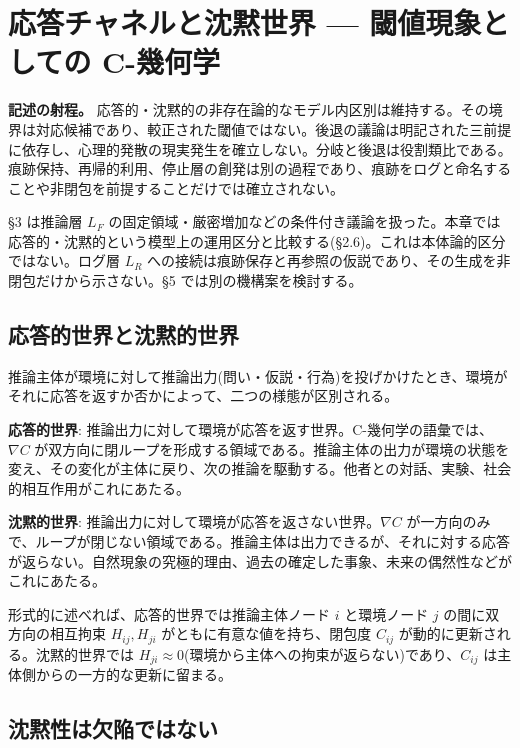 \section{応答チャネルと沈黙世界 — 閾値現象としての C-幾何学}

\noindent\textbf{記述の射程。} 応答的・沈黙的の非存在論的なモデル内区別は維持する。その境界は対応候補であり、較正された閾値ではない。後退の議論は明記された三前提に依存し、心理的発散の現実発生を確立しない。分岐と後退は役割類比である。痕跡保持、再帰的利用、停止層の創発は別の過程であり、痕跡をログと命名することや非閉包を前提することだけでは確立されない。



\S{}3 は推論層 $L_F$ の固定領域・厳密増加などの条件付き議論を扱った。本章では応答的・沈黙的という模型上の運用区分と比較する(\S{}2.6)。これは本体論的区分ではない。ログ層 $L_R$ への接続は痕跡保存と再参照の仮説であり、その生成を非閉包だけから示さない。\S{}5 では別の機構案を検討する。

\bigskip


\subsection{応答的世界と沈黙的世界}


推論主体が環境に対して推論出力(問い・仮説・行為)を投げかけたとき、環境がそれに応答を返すか否かによって、二つの様態が区別される。

\textbf{応答的世界}:
推論出力に対して環境が応答を返す世界。C-幾何学の語彙では、$\nabla C$ が双方向に閉ループを形成する領域である。推論主体の出力が環境の状態を変え、その変化が主体に戻り、次の推論を駆動する。他者との対話、実験、社会的相互作用がこれにあたる。

\textbf{沈黙的世界}:
推論出力に対して環境が応答を返さない世界。$\nabla C$ が一方向のみで、ループが閉じない領域である。推論主体は出力できるが、それに対する応答が返らない。自然現象の究極的理由、過去の確定した事象、未来の偶然性などがこれにあたる。

形式的に述べれば、応答的世界では推論主体ノード $i$ と環境ノード $j$ の間に双方向の相互拘束 $H_{ij}, H_{ji}$ がともに有意な値を持ち、閉包度 $C_{ij}$ が動的に更新される。沈黙的世界では $H_{ji} \approx 0$(環境から主体への拘束が返らない)であり、$C_{ij}$ は主体側からの一方的な更新に留まる。

\bigskip


\subsection{沈黙性は欠陥ではない}


